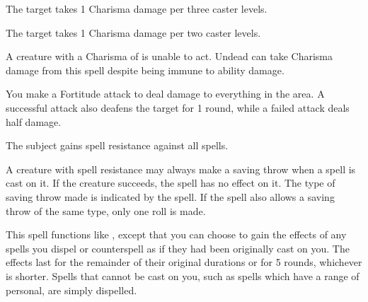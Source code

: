 \spellrng{\rngfar}
\begin{spellhealthy}
  The target takes 1 Charisma damage per three caster levels.
\end{spellhealthy}
\begin{spellblood}
  The target takes 1 Charisma damage per two caster levels.
\end{spellblood}
\begin{spellnotes}
  A creature with a Charisma of  is unable to act. Undead can take Charisma damage from this spell despite being immune to ability damage. 
\end{spellnotes}

\spellrng{\rngclose}
\begin{spelleffect}
    You make a Fortitude attack to deal damage to everything in the area. A successful attack also deafens the target for 1 round, while a failed attack deals half damage.
\end{spelleffect}

\spellrng{\rngclose}
\spelldur{\durshort}
\begin{spelleffect}
  The subject gains spell resistance against all spells.
\end{spelleffect}
\begin{spellnotes}
  A creature with spell resistance may always make a saving throw when a spell is cast on it. If the creature succeeds, the spell has no effect on it. The type of saving throw made is indicated by the spell. If the spell also allows a saving throw of the same type, only one roll is made.
\end{spellnotes}

\begin{spelleffect}
  This spell functions like , except that you can choose to gain the effects of any spells you dispel or counterspell as if they had been originally cast on you. The effects last for the remainder of their original durations or for 5 rounds, whichever is shorter. Spells that cannot be cast on you, such as spells which have a range of personal, are simply dispelled.
\end{spelleffect}

